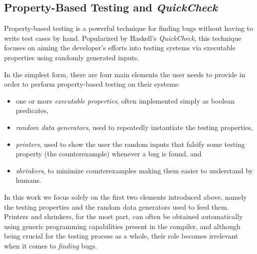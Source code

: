 \documentclass[sigconf, anonymous]{acmart}
\newcommand{\quickcheck}{\textit{QuickCheck}\xspace}
\newcommand{\quickchick}{\textit{QuickChick}\xspace}
\newcommand{\mutagen}{\textsc{Mutagen}\xspace}
\begin{document}

\vspace{-5pt}
\subsection{Property-Based Testing and \quickcheck}

Property-based testing is a powerful technique for finding bugs without having
to write test cases by hand.
%
Popularized by Haskell's \quickcheck, this technique focuses on aiming the
developer's efforts into testing systems via executable properties using
randomly generated inputs.
%


In the simplest form, there are four main elements the user needs to provide in
order to perform property-based testing on their systems:
%
\begin{itemize}
\item one or more \emph{executable properties}, often implemented simply as
  boolean predicates,
\item \emph{random data generators}, used to repeatedly instantiate the testing
  properties,
\item \emph{printers}, used to show the user the random inputs that falsify some
  testing property (the counterexample) whenever a bug is found, and
\item \emph{shrinkers}, to minimize counterexamples making them easier to
  understand by humans.
\end{itemize}

\noindent In this work we focus solely on the first two elements introduced
above, namely the testing properties and the random data generators used to feed
them.
%
Printers and shrinkers, for the most part, can often be obtained automatically
using generic programming capabilities present in the compiler, and although
being crucial for the testing process as a whole, their role becomes irrelevant
when it comes to \emph{finding} bugs.

\begin{algorithm}
  \SetInd{0em}{0.75em}
  \SetAlgoLined
  \DontPrintSemicolon
\caption{\label{algo:quickcheck}\quickcheck Testing Loop}
\end{algorithm}
\end{document}
